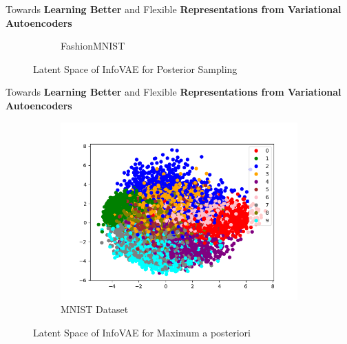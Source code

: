\documentclass[hyperref={colorlinks,citecolor=blue,linkcolor=blue,urlcolor=blue}]{beamer}
\begin{document}
\begin{frame}{ Towards \textbf{Learning Better} and Flexible \textbf{Representations from Variational Autoencoders} \vspace{0.3em}}
\begin{figure}
\begin{subfigure}[b]{0.4\textwidth}
        \caption{FashionMNIST}
    \end{subfigure}
    \caption{Latent Space of InfoVAE for Posterior Sampling}
  \end{figure}
\end{frame}

\begin{frame}{ Towards \textbf{Learning Better} and Flexible \textbf{Representations from Variational Autoencoders} \vspace{0.3em}}
  \begin{figure}
    \begin{subfigure}[b]{0.4\textwidth}
        \centering
        \includegraphics[width=\textwidth,]{./Images/latent_MNIST_MMD_MAP.png}
        \caption{MNIST Dataset}
    \end{subfigure}
    \caption{Latent Space of InfoVAE for Maximum a posteriori}
  \end{figure}
\end{frame}
\end{document}
